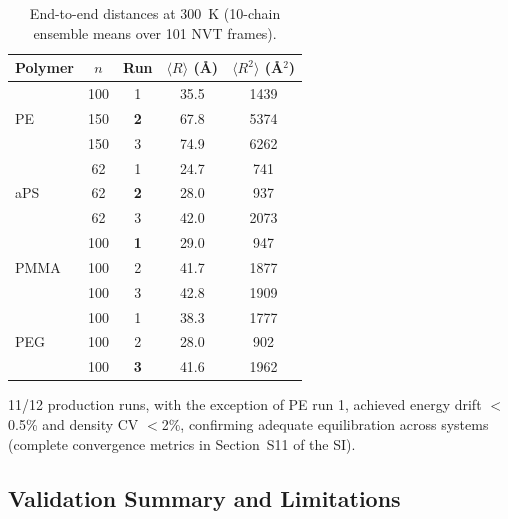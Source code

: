 \documentclass[journal=acsami,manuscript=article]{achemso}
\begin{document}
\begin{table}[H]
\centering
\caption{End-to-end distances at 300~K (10-chain ensemble means over 101 NVT frames).}
\label{tab:e2e}
\small
\begin{tabular}{@{}lcccc@{}}
\toprule
\textbf{Polymer} & \textbf{$n$} & \textbf{Run} & \textbf{$\langle R \rangle$ (\AA{})} & \textbf{$\langle R^2 \rangle$ (\AA{}$^2$)} \\
\midrule
\multirow{3}{*}{PE}   & 100  & 1 & 35.5 & 1439 \\
                       & 150 & \textbf{2} & 67.8 & 5374 \\
                       & 150 & 3 & 74.9 & 6262 \\
\midrule
\multirow{3}{*}{aPS}  & 62  & 1 & 24.7 & 741 \\
                       & 62  & \textbf{2} & 28.0 & 937 \\
                       & 62  & 3 & 42.0 & 2073 \\
\midrule
\multirow{3}{*}{PMMA} & 100 & \textbf{1} & 29.0 & 947 \\
                       & 100 & 2 & 41.7 & 1877 \\
                       & 100 & 3 & 42.8 & 1909 \\
\midrule
\multirow{3}{*}{PEG}  & 100 & 1 & 38.3 & 1777 \\
                       & 100 & 2 & 28.0 & 902 \\
                       & 100 & \textbf{3} & 41.6 & 1962 \\
\bottomrule
\end{tabular}
\end{table}

11/12 production runs, with the exception of PE run 1, achieved energy drift $<$0.5\% and density CV $<$2\%, confirming adequate equilibration across systems (complete convergence metrics in Section~S11 of the SI).


\subsection{Validation Summary and Limitations}
\end{document}
